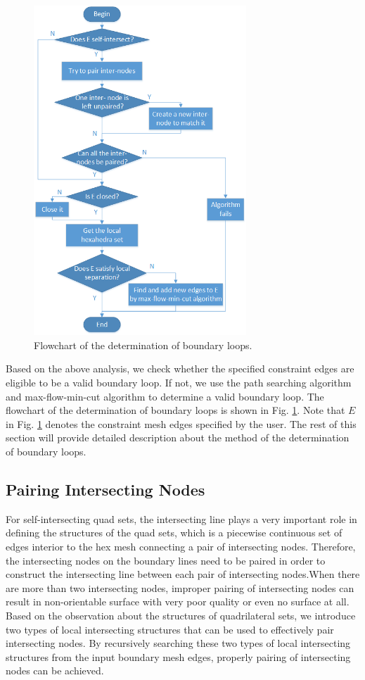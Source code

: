 \documentclass[final,5p,times,twocolumn]{elsarticle}
\begin{document}
\begin{figure}[htbp]
\begin{center}
\includegraphics[width=8cm]{flow_det_loop.png}
\caption{Flowchart of the determination of boundary loops.}
\label{fig:flow_det_loop}
\end{center}
\end{figure}

Based on the above analysis, we check whether the specified constraint edges are eligible to be a valid boundary loop. If not, we use the path searching algorithm and max-flow-min-cut algorithm to determine a valid boundary loop. The flowchart of the determination of boundary loops is shown in Fig. \ref{fig:flow_det_loop}. Note that $E$ in Fig. \ref{fig:flow_det_loop} denotes the constraint mesh edges specified by the user. The rest of this section will provide detailed description about the method of the determination of boundary loops.

\subsection{Pairing Intersecting Nodes}
\label{sec:int_pt_pair}
For self-intersecting quad sets, the intersecting line plays a very important role in defining the structures of the quad sets, which is a piecewise continuous set of edges interior to the hex mesh connecting a pair of intersecting nodes. Therefore, the intersecting nodes on the boundary lines need to be paired in order to construct the intersecting line between each pair of intersecting nodes.When there are more than two intersecting nodes, improper pairing of intersecting nodes can result in non-orientable surface with very poor quality or even no surface at all\cite{Suzuki:2010hn}. Based on the observation about the structures of quadrilateral sets, we introduce two types of local intersecting structures that can be used to effectively pair intersecting nodes. By recursively searching these two types of local intersecting structures from the input boundary mesh edges, properly pairing of intersecting nodes can be achieved.
\end{document}
